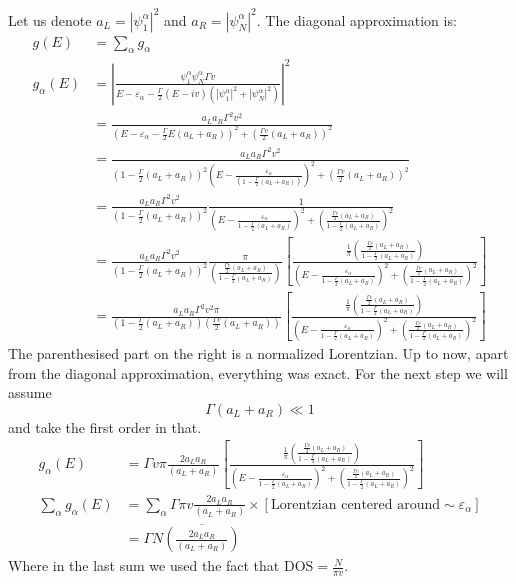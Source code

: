 \documentclass[11pt]{article}
\begin{document}
Let us denote ${a_L = |\psi_1^{\alpha}|^2 }$ and ${a_R = |\psi_N^{\alpha}|^2 }$.
The diagonal approximation is:
\begin{align*} 
g(E)&= \sum_\alpha g_\alpha \\
g_\alpha(E) &= \left|\frac{\psi_1^\alpha\psi_N^\alpha\Gamma v}{E-\varepsilon_\alpha - \frac{\Gamma}{2}(E-iv)\left(|\psi_1^\alpha|^2+|\psi_N^\alpha|^2\right)}\right|^2\\
&= \frac{a_La_R\Gamma^2 v^2}{\left(E-\varepsilon_\alpha - \frac{\Gamma}{2}E(a_L+a_R)\right)^2 + \left(\frac{\Gamma v}{2}(a_L+a_R)\right)^2}\\
&= \frac{a_La_R\Gamma^2 v^2}{\left(1-\frac{\Gamma}{2}(a_L+a_R)\right)^2\left(E-\frac{\varepsilon_\alpha}{\left(1-\frac{\Gamma}{2}(a_L+a_R)\right)}\right)^2 + \left(\frac{\Gamma v}{2}(a_L+a_R)\right)^2}\\
&= \frac{a_La_R\Gamma^2 v^2}{\left(1-\frac{\Gamma}{2}(a_L+a_R)\right)^2}\frac{1}{\left(E-\frac{\varepsilon_\alpha}{1-\frac{\Gamma}{2}(a_L+a_R)}\right)^2 + \left(\frac{\frac{\Gamma v}{2}(a_L+a_R)}{1-\frac{\Gamma}{2}(a_L+a_R)}\right)^2}\\
&= \frac{a_La_R\Gamma^2 v^2}{\left(1-\frac{\Gamma}{2}(a_L+a_R)\right)^2}\frac{\pi}{\left(\frac{\frac{\Gamma v}{2}(a_L+a_R)}{1-\frac{\Gamma}{2}(a_L+a_R)}\right)}\left[\frac{\frac{1}{\pi}\left(\frac{\frac{\Gamma v}{2}(a_L+a_R)}{1-\frac{\Gamma}{2}(a_L+a_R)}\right)}{\left(E-\frac{\varepsilon_\alpha}{1-\frac{\Gamma}{2}(a_L+a_R)}\right)^2 + \left(\frac{\frac{\Gamma v}{2}(a_L+a_R)}{1-\frac{\Gamma}{2}(a_L+a_R)}\right)^2}\right]\\
&= \frac{a_La_R\Gamma^2 v^2\pi}{\left(1-\frac{\Gamma}{2}(a_L+a_R)\right)\left(\frac{\Gamma v}{2}(a_L+a_R)\right)}
\left[\frac{\frac{1}{\pi}\left(\frac{\frac{\Gamma v}{2}(a_L+a_R)}{1-\frac{\Gamma}{2}(a_L+a_R)}\right)}{\left(E-\frac{\varepsilon_\alpha}{1-\frac{\Gamma}{2}(a_L+a_R)}\right)^2 + \left(\frac{\frac{\Gamma v}{2}(a_L+a_R)}{1-\frac{\Gamma}{2}(a_L+a_R)}\right)^2}\right]
\end{align*}
%
The parenthesised part on the right is a normalized Lorentzian. 
Up to now, apart from the diagonal approximation, everything was exact.  
For the next step we will assume
\[\Gamma(a_L+a_R) \ll 1\]
and take the first order in that. 
\begin{align*}
g_\alpha(E)
&= {\Gamma v\pi}\frac{2a_La_R}{(a_L+a_R)}
\left[\frac{\frac{1}{\pi}\left(\frac{\frac{\Gamma v}{2}(a_L+a_R)}{1-\frac{\Gamma}{2}(a_L+a_R)}\right)}{\left(E-\frac{\varepsilon_\alpha}{1-\frac{\Gamma}{2}(a_L+a_R)}\right)^2 + \left(\frac{\frac{\Gamma v}{2}(a_L+a_R)}{1-\frac{\Gamma}{2}(a_L+a_R)}\right)^2}\right] \\
\sum_\alpha g_\alpha (E) &= \sum_\alpha\Gamma \pi v \frac{2a_La_R}{(a_L+a_R)}\times [\textrm{Lorentzian centered around} \sim \varepsilon_\alpha]\\
&= \Gamma N\overline{\left(\frac{2a_La_R}{(a_L+a_R)}\right)} 
\end{align*}
Where in the last sum we used the fact that ${\textrm{DOS} = \frac{N}{\pi v}}$.
\end{document}
